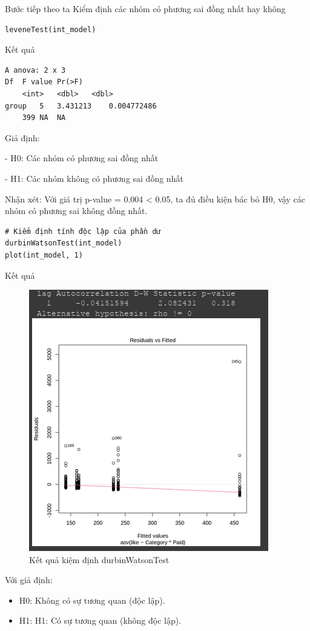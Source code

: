 \begin{itemize}
Bước tiếp theo ta Kiểm định các nhóm có phương sai đồng nhất hay không
\begin{lstlisting}
leveneTest(int_model)
\end{lstlisting}

Kết quả
\begin{lstlisting}
A anova: 2 x 3 	
Df	F value	Pr(>F)
	<int>	<dbl>	<dbl>
group	5	3.431213	0.004772486
	399	NA	NA
\end{lstlisting}

Giả định:

- H0: Các nhóm có phương sai đồng nhất

- H1: Các nhóm không có phương sai đồng nhất

Nhận xét: Với giá trị p-value = 0.004 < 0.05, ta đủ điều kiện bác bỏ H0, vậy các nhóm có phương sai không đồng nhất.

\newpage
\begin{lstlisting}
# Kiểm định tính độc lập của phần dư
durbinWatsonTest(int_model)
plot(int_model, 1)
\end{lstlisting}

Kết quả 
\begin{figure}[H]
    \centering
    \includegraphics[width=0.8\linewidth]{part23_figures/07.png}
    \caption{Kết quả kiệm định durbinWatsonTest}
    \label{fig:Kết quả kiệm định durbinWatsonTest}
\end{figure}
Với giả định:
\begin{itemize}
    \item H0: Không có sự tương quan (độc lập).
    \item H1: H1: Có sự tương quan (không độc lập).
\end{itemize}


\end{itemize}
